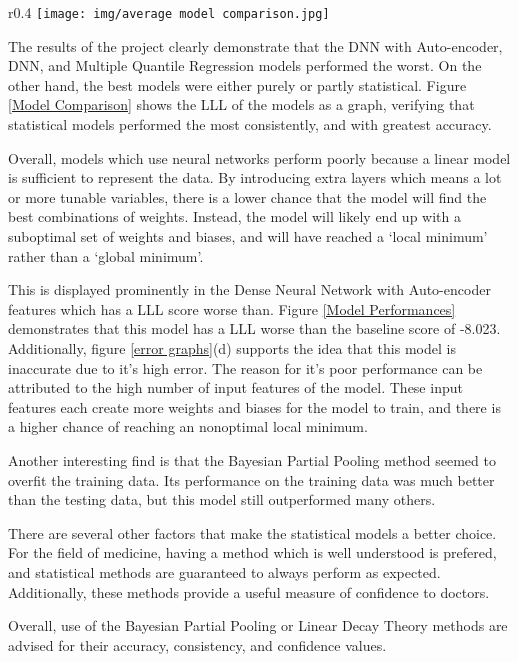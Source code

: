 \documentclass[12pt]{article}
\begin{document}
\begin{wrapfigure}{r}{0.4\textwidth}
    \centering
    \texttt{[image: img/average model comparison.jpg]}
    
    \caption{Comparison of Average Model LLL}
    \label{Model Comparison}
\end{wrapfigure}

The results of the project clearly demonstrate that the DNN with Auto-encoder, DNN, and Multiple Quantile Regression models performed the worst.
On the other hand, the best models were either purely or partly statistical. 
Figure \ref{Model Comparison} shows the LLL of the models as a graph, verifying that statistical models performed the most consistently, and with greatest accuracy.

Overall, models which use neural networks perform poorly because a linear model is sufficient to represent the data.
By introducing extra layers which means a lot or more tunable variables, there is a lower chance that the model will find the best combinations of weights.
Instead, the model will likely end up with a suboptimal set of weights and biases, and will have reached a `local minimum' rather than a `global minimum'.

This is displayed prominently in the Dense Neural Network with Auto-encoder features which has a LLL score worse than.
Figure \ref{Model Performances} demonstrates that this model has a LLL worse than the baseline score of -8.023.
Additionally, figure \ref{error graphs}(d) supports the idea that this model is inaccurate due to it's high error.
The reason for it's poor performance can be attributed to the high number of input features of the model.
These input features each create more weights and biases for the model to train, and there is a higher chance of reaching an nonoptimal local minimum.

Another interesting find is that the Bayesian Partial Pooling method seemed to overfit the training data.
Its performance on the training data was much better than the testing data, but this model still outperformed many others.

There are several other factors that make the statistical models a better choice. 
For the field of medicine, having a method which is well understood is prefered, and statistical methods are guaranteed to always perform as expected.
Additionally, these methods provide a useful measure of confidence to doctors.

Overall, use of the Bayesian Partial Pooling or Linear Decay Theory methods are advised for their accuracy, consistency, and confidence values.
\end{document}
